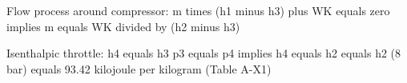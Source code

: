 Flow process around compressor:
m times (h1 minus h3) plus WK equals zero
implies m equals WK divided by (h2 minus h3)

Isenthalpic throttle:
h4 equals h3
p3 equals p4
implies h4 equals h2 equals h2 (8 bar)
equals 93.42 kilojoule per kilogram
(Table A-X1)